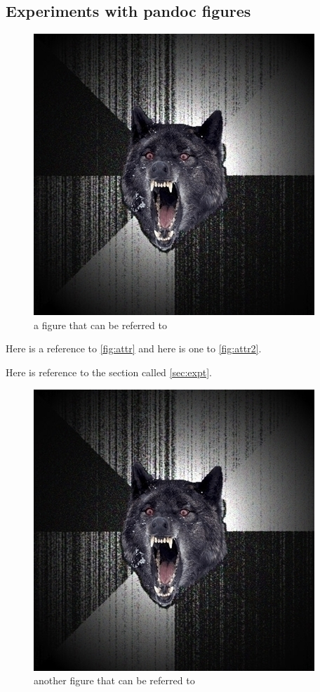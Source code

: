 \subsection{Experiments with pandoc figures}\label{sec:expt}


\begin{figure}[htbp]
\centering
\includegraphics{image.png}
\caption{a figure that can be referred to}
\label{fig:attr}
\end{figure}

Here is a reference to \autoref{fig:attr} and here is one to
\autoref{fig:attr2}.

Here is reference to the section called \autoref{sec:expt}.


\begin{figure}[htbp]
\centering
\includegraphics{image.png}
\caption{another figure that can be referred to}
\label{fig:attr2}
\end{figure}

